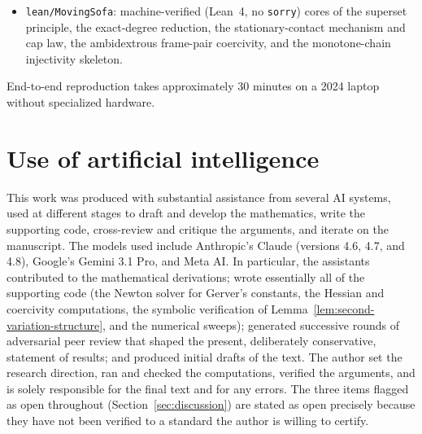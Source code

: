 \documentclass[11pt]{amsart}
\theoremstyle{plain}
\theoremstyle{definition}
\begin{document}
\begin{itemize}
        facts found en route: a reversal pocket of a contact arc
        \emph{retraces} the envelope (so chord cuts must span positive
        net displacement before the flanking arcs are disjoint as
        sets), and for non-simple frozen curves the correct side
        condition is the winding form of Lemma~\ref{lem:superset}
        ($\operatorname{wind}_{\Gamma}\geq 1$ on $S$,
        $\geq 0$ elsewhere), under which exact retraces cancel in the
        Green functional.
  \item \texttt{lean/MovingSofa}: machine-verified (Lean~4, no
        \texttt{sorry}) cores of the superset principle, the
        exact-degree reduction, the stationary-contact mechanism and
        cap law, the ambidextrous frame-pair coercivity, and the
        monotone-chain injectivity skeleton.
\end{itemize}
End-to-end reproduction takes approximately $30$ minutes on a 2024
laptop without specialized hardware.

\section*{Use of artificial intelligence}

This work was produced with substantial assistance from several AI
systems, used at different stages to draft and develop the mathematics,
write the supporting code, cross-review and critique the arguments, and
iterate on the manuscript.  The models used include Anthropic's Claude
(versions 4.6, 4.7, and 4.8), Google's Gemini 3.1 Pro, and Meta AI.
In particular, the assistants contributed to the mathematical
derivations; wrote essentially all of the supporting code (the Newton
solver for Gerver's constants, the Hessian and coercivity computations,
the symbolic verification of Lemma~\ref{lem:second-variation-structure},
and the numerical sweeps); generated successive rounds of adversarial
peer review that shaped the present, deliberately conservative,
statement of results; and produced initial drafts of the text.  The
author set the research direction, ran and checked the computations,
verified the arguments, and is solely responsible for the final text
and for any errors.  The three items flagged as open throughout
(Section~\ref{sec:discussion}) are stated as open precisely because
they have not been verified to a standard the author is willing to
certify.
\end{document}

